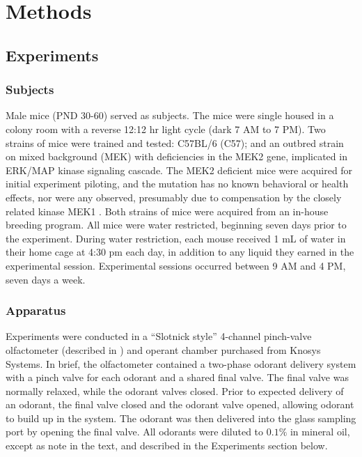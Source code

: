 \section*{Methods}
\label{sec:methods}
\subsection*{Experiments}

\subsubsection*{Subjects}
\label{sec:methods_subjects}
Male mice (PND 30-60) served as subjects. The mice were single housed in a colony room with a reverse 12:12 hr light cycle (dark 7 AM to 7 PM). Two strains of mice were trained and tested: C57BL/6 (C57); and an outbred strain on mixed background (MEK) with deficiencies in the MEK2 gene, implicated in ERK/MAP kinase signaling cascade. The MEK2 deficient mice were acquired for initial experiment piloting, and the mutation has no known behavioral or health effects, nor were any observed, presumably due to compensation by the closely related kinase MEK1 \cite{12832465}. Both strains of mice were acquired from an in-house breeding program. All mice were water restricted, beginning seven days prior to the experiment. During water restriction, each mouse received 1 mL of water in their home cage at 4:30 pm each day, in addition to any liquid they earned in the experimental session. Experimental sessions occurred between 9 AM and 4 PM, seven days a week.

\subsubsection*{Apparatus}
\label{sec:methods_apparatus}
Experiments were conducted in a ``Slotnick style'' 4-channel pinch-valve olfactometer (described in \cite{18428626}) and operant chamber purchased from Knosys Systems. In brief, the olfactometer contained a two-phase odorant delivery system with a pinch valve for each odorant and a shared final valve. The final valve was normally relaxed, while the odorant valves closed. Prior to expected delivery of an odorant, the final valve closed and the odorant valve opened, allowing odorant to build up in the system. The odorant was then delivered into the glass sampling port by opening the final valve. All odorants were diluted to $0.1\%$ in mineral oil, except as note in the text, and described in the Experiments section below.

